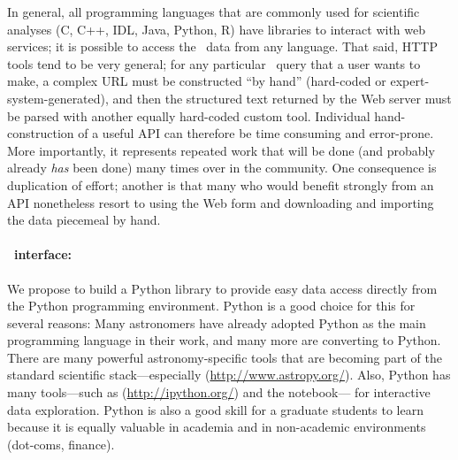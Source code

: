 \documentclass[letterpaper,12pt,preprint]{hack_aastex}
\newcommand{\hurl}[1]{{\scriptsize\url{#1}}}
\newcommand{\kplr}{\package{kplr}}
\begin{document}
In general, all programming languages that are commonly used for scientific
analyses (C, C++, IDL, Java, Python, R) have
libraries to interact with web services; it is
possible to access the \Kepler\ data from any language.
That said, HTTP tools tend to be very general;
for any particular \Kepler\ query that a user wants to make,
a complex URL must be constructed ``by hand'' (hard-coded or
expert-system-generated), and then the structured text returned by the Web server must be
parsed with another equally hard-coded custom tool.
Individual hand-construction of a useful API can therefore
be time consuming and error-prone.
More importantly, it represents repeated work that will be done (and probably
already \emph{has} been done) many times over in the community.
One consequence is duplication of effort; another is that many who would
benefit strongly from an API nonetheless resort to using the Web form
and downloading and importing the data piecemeal by hand.

\paragraph{\kplr\ interface:}
We propose to build a Python library to provide easy data access directly
from the Python programming environment.
Python is a good choice for this for several reasons:
Many astronomers have already adopted Python as the main
programming language in their work, and many more are
converting to Python.
There are many powerful astronomy-specific tools that are becoming part of
the standard scientific stack---especially 
 (\hurl{http://www.astropy.org/}).
Also, Python has many tools---such as 
 (\hurl{http://ipython.org/}) and the  notebook---%
for interactive data exploration.
Python is also a good skill for a graduate students to learn
because it is equally valuable in academia and in non-academic
environments (dot-coms, finance).
\end{document}
